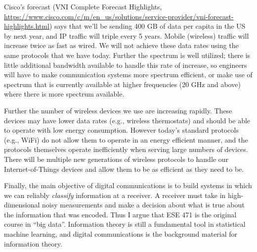 Cisco's forecast (VNI Complete Forecast Highlights, \url{https://www.cisco.com/c/m/en_us/solutions/service-provider/vni-forecast-highlights.html}) says that we'll be sending 400 GB of data per capita in the US by next year, and IP traffic will triple every 5 years.  Mobile (wireless) traffic will increase twice as fast as wired.  We will not achieve these data rates using the same protocols that we have today.  Further the spectrum is well utilized; there is little additional bandwidth available to handle this rate of increase, so engineers will have to make communication systems more spectrum efficient, or make use of spectrum that is currently available at higher frequencies (20 GHz and above) where there is more spectrum available.  

Further the number of wireless devices we use are increasing rapidly.  These devices may have lower data rates (e.g., wireless thermostats) and should be able to operate with low energy consumption.  However today's  standard protocols (e.g., WiFi) do not allow them to operate in an energy efficient manner, and the protocols themselves operate inefficiently when serving large numbers of devices.  There will be multiple new generations of wireless protocols to handle our Internet-of-Things devices and allow them to be as efficient as they need to be.

Finally, the main objective of digital communications is to build systems in which we can reliably \emph{classify} information at a receiver.  A receiver must take in high-dimensional noisy measurements and make a decision about what is true about the information that was encoded.  Thus I argue that ESE 471 is the original course in ``big data''.  Information theory is still a fundamental tool in statistical machine learning, and digital communications is the background material for information theory.

%
